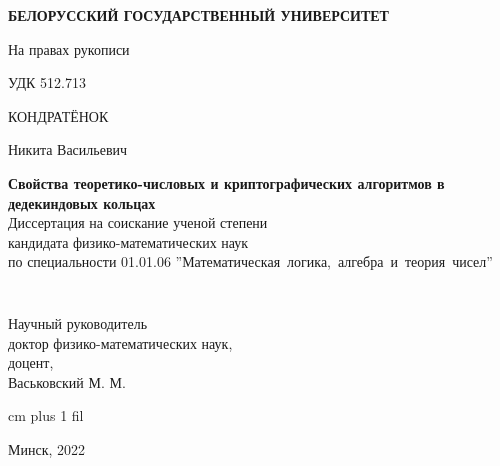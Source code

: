 \thispagestyle{empty}
\normalsize
\begin{center}
{\fontsize{16}{16}\selectfont \textbf{БЕЛОРУССКИЙ ГОСУДАРСТВЕННЫЙ УНИВЕРСИТЕТ}}
\end{center}
\vspace{4ex}
\normalsize

\noindent На правах рукописи\par
\noindent УДК 512.713 %

\normalsize
\begin{center}
\vspace{6ex}
{\fontsize{16}{16}\selectfont КОНДРАТЁНОК}

{\fontsize{16}{16}\selectfont Никита Васильевич}
\end{center}
\vspace{0ex}
\begin{center}
\large
\textbf{Свойства теоретико-числовых и криптографических алгоритмов в дедекиндовых кольцах}\\
\vspace{4ex}
{\fontsize{15}{15}\selectfont Диссертация на соискание ученой степени}\\
{\fontsize{15}{15}\selectfont кандидата физико-математических наук}\\
\vspace{2ex}
{\fontsize{15}{15}\selectfont по специальности 01.01.06 ''Математическая~логика,~алгебра~и~теория~чисел''}
\vspace{2ex}
\end{center}


\normalsize
\vspace{3ex}
\begin{minipage}{0.4\textwidth}
  \begin{flushleft}
$\,$\\
$\,$\\
$\,$\\
$\,$\\
\end{flushleft}
\end{minipage}
$\quad$
\begin{minipage}{0.5\textwidth}
  \begin{flushleft}
Научный руководитель\\
доктор физико-математических наук,\\
доцент,\\
Васьковский М. М.\\
  \end{flushleft}
\end{minipage}


 cm plus 1 fil
\begin{center}
Минск, 2022
\end{center}
\eject
